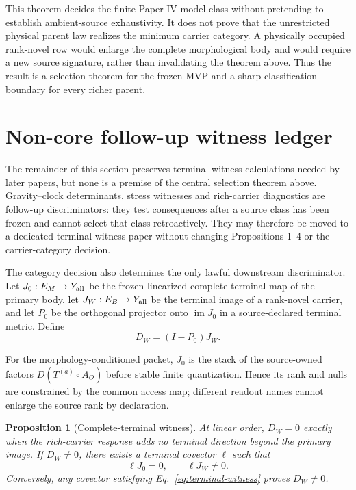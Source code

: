 \documentclass[11pt]{article}
\newtheorem{proposition}{Proposition}
\begin{document}
This theorem decides the finite Paper-IV model class without pretending to
establish ambient-source exhaustivity. It does not prove that the unrestricted
physical parent law realizes the minimum carrier category. A physically occupied rank-novel row
would enlarge the complete morphological body and would require a new source
signature, rather than invalidating the theorem above. Thus the result is a
selection theorem for the frozen MVP and a sharp classification boundary for
every richer parent.

\section{Non-core follow-up witness ledger}

The remainder of this section preserves terminal witness calculations needed
by later papers, but none is a premise of the central selection theorem above.
Gravity--clock determinants, stress witnesses and rich-carrier diagnostics are
follow-up discriminators: they test consequences after a source class has been
frozen and cannot select that class retroactively. They may therefore be moved
to a dedicated terminal-witness paper without changing Propositions 1--4 or
the carrier-category decision.

The category decision also determines the only lawful downstream
discriminator. Let
\(J_0:E_M\rightarrow Y_{\rm all}\) be the frozen linearized complete-terminal
map of the primary body, let \(J_W:E_B\rightarrow Y_{\rm all}\) be the
terminal image of a rank-novel carrier, and let \(P_0\) be the orthogonal
projector onto \(\operatorname{im}J_0\) in a source-declared terminal metric.
Define
\begin{equation}
 D_W=(I-P_0)J_W.
 \label{eq:terminal-novelty}
\end{equation}

For the morphology-conditioned packet, $J_0$ is the stack of the
source-owned factors $D(T^{(a)}\circ A_O)$ before stable finite
quantization. Hence its rank and nulls are constrained by the common access
map; different readout names cannot enlarge the source rank by declaration.

\begin{proposition}[Complete-terminal witness]
At linear order, \(D_W=0\) exactly when the rich-carrier response adds no
terminal direction beyond the primary image. If \(D_W\ne0\), there exists a
terminal covector \(\ell\) such that
\begin{equation}
 \ell J_0=0,
 \qquad
 \ell J_W\ne0.
 \label{eq:terminal-witness}
\end{equation}
Conversely, any covector satisfying Eq.~\eqref{eq:terminal-witness} proves
\(D_W\ne0\).
\end{proposition}
\end{document}
